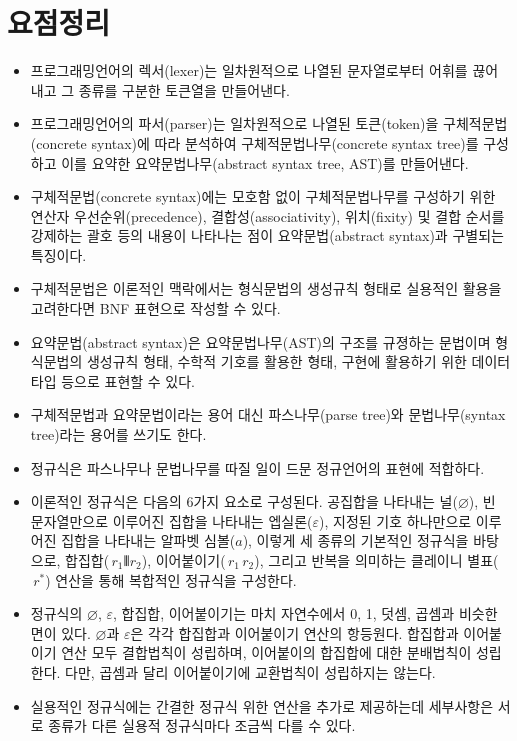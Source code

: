 \section*{요점정리}
\begin{itemize}
\item 프로그래밍언어의 렉서(lexer)는 일차원적으로 나열된 문자열로부터
      어휘를 끊어내고 그 종류를 구분한 토큰열을 만들어낸다.
\item 프로그래밍언어의 파서(parser)는 일차원적으로 나열된
      토큰(token)을 구체적문법(concrete syntax)에 따라 분석하여
      구체적문법나무(concrete syntax tree)를 구성하고 이를 요약한
      요약문법나무(abstract syntax tree, AST)를 만들어낸다.
\item 구체적문법(concrete syntax)에는 모호함 없이 구체적문법나무를
      구성하기 위한 연산자 우선순위(precedence), 결합성(associativity),
      위치(fixity) 및 결합 순서를 강제하는 괄호 등의 내용이 나타나는
      점이 요약문법(abstract syntax)과 구별되는 특징이다.
\item 구체적문법은 이론적인 맥락에서는 형식문법의 생성규칙 형태로
      실용적인 활용을 고려한다면 BNF 표현으로 작성할 수 있다.
\item 요약문법(abstract syntax)은 요약문법나무(AST)의 구조를 규졍하는
      문법이며 형식문법의 생성규칙 형태, 수학적 기호를 활용한 형태,
      구현에 활용하기 위한 데이터 타입 등으로 표현할 수 있다.
\item 구체적문법과 요약문법이라는 용어 대신 파스나무(parse tree)와
      문법나무(syntax tree)라는 용어를 쓰기도 한다.
\item 정규식은 파스나무나 문법나무를 따질 일이 드문 정규언어의 표현에 적합하다.
\item 이론적인 정규식은 다음의 6가지 요소로 구성된다.
      공집합을 나타내는 널($\varnothing$),
      빈 문자열만으로 이루어진 집합을 나타내는 엡실론($\varepsilon$),
      지정된 기호 하나만으로 이루어진 집합을 나타내는 알파벳 심볼($a$),
      이렇게 세 종류의 기본적인 정규식을 바탕으로, 합집합($\,r_1 \VERT r_2$),
      이어붙이기($\,r_1\,r_2$), 그리고 반복을 의미하는 클레이니 별표($\,r^{*}$) 연산을
      통해 복합적인 정규식을 구성한다.
\item 정규식의 $\varnothing$, $\varepsilon$, 합집합, 이어붙이기는 마치 자연수에서
      0, 1, 덧셈, 곱셈과 비슷한 면이 있다. $\varnothing$과 $\varepsilon$은
      각각 합집합과 이어붙이기 연산의 항등원다. 합집합과 이어붙이기 연산
      모두 결합법칙이 성립하며, 이어붙이의 합집합에 대한 분배법칙이 성립한다.
      다만, 곱셈과 달리 이어붙이기에 교환법칙이 성립하지는 않는다.
\item 실용적인 정규식에는 간결한 정규식 위한 연산을 추가로 제공하는데
      세부사항은 서로 종류가 다른 실용적 정규식마다 조금씩 다를 수 있다. 
\end{itemize}


